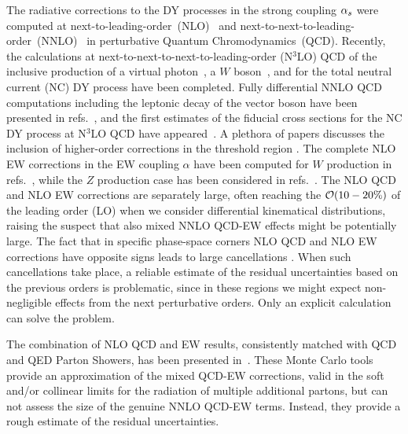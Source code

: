 \documentclass[11pt,a4paper]{article}
\begin{document}
The radiative corrections to the DY processes in the strong coupling $\alpha_{s}$
were computed
at next-to-leading-order~(NLO)~\cite{Altarelli:1979ub} and next-to-next-to-leading-order~(NNLO)~\cite{Hamberg:1990np,Harlander:2002wh} in perturbative Quantum Chromodynamics~(QCD).
Recently, the calculations at next-to-next-to-next-to-leading-order (N$^3$LO) QCD of the inclusive production of a virtual photon~\cite{Duhr:2020seh}, a $W$ boson~\cite{Duhr:2020sdp}, and for the total neutral current (NC) DY process \cite{Duhr:2021vwj} have been completed.
Fully differential NNLO QCD computations including the leptonic decay of the vector boson have been
presented in refs.~\cite{Anastasiou:2003yy,Anastasiou:2003ds,Melnikov:2006kv,Catani:2009sm,Catani:2010en},
and the first estimates of the fiducial cross sections for the NC DY process at  N$^3$LO QCD  have appeared~\cite{Camarda:2021ict}.
% 
%
A plethora of papers discusses the inclusion of higher-order corrections in
the threshold region \cite{Moch:2005ky,Laenen:2005uz,Ravindran:2005vv,Ravindran:2006cg,deFlorian:2012za,Ahmed:2014cla,Catani:2014uta,Li:2014afw,Ajjath:2020ulr}.
%
The complete NLO EW corrections in the EW coupling $\alpha$ have been computed for $W$ production  in refs.~\cite{Dittmaier:2001ay,Baur:2004ig,Zykunov:2006yb,Arbuzov:2005dd,CarloniCalame:2006zq},
while the $Z$ production case has been considered in refs.~\cite{Baur:2001ze,Zykunov:2005tc,CarloniCalame:2007cd,Arbuzov:2007db,Dittmaier:2009cr}.
%
%
The NLO  QCD and NLO EW corrections are separately large, often reaching the ${\cal O}(10-20\%)$ of the leading order (LO) when we consider differential kinematical distributions,
raising the suspect that also mixed NNLO QCD-EW effects might be potentially large.
The fact that in specific phase-space corners NLO QCD and NLO EW corrections have opposite signs leads to large cancellations  \cite{Balossini:2009sa}.
When such cancellations take place, a reliable estimate of the residual uncertainties based on the previous orders is problematic, since in these regions we might expect non-negligible effects from the next perturbative orders.
Only an explicit calculation can solve the problem.


The combination of NLO QCD and EW results, consistently matched with QCD and QED Parton Showers,
has been presented in~\cite{Bernaciak:2012hj,Barze:2012tt,Barze:2013fru,Frederix:2018nkq}.
These Monte Carlo tools provide an approximation of the mixed QCD-EW corrections, valid in the soft and/or collinear limits for the radiation of multiple additional partons,
but can not assess the size of the genuine NNLO QCD-EW terms. Instead, they provide a rough estimate of the residual uncertainties.
\end{document}
